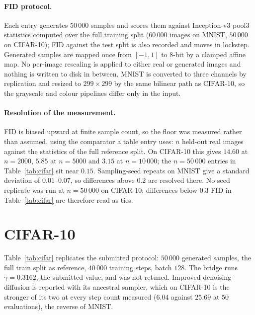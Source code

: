 \documentclass[11pt,a4paper]{article}
\begin{document}
\paragraph{FID protocol.} Each entry generates $50\,000$ samples and scores them
against Inception-v3 pool3 statistics computed over the full training split
($60\,000$ images on MNIST, $50\,000$ on CIFAR-10); FID against the test split is
also recorded and moves in lockstep. Generated samples are mapped once from
$[-1,1]$ to 8-bit by a clamped affine map. No per-image rescaling is applied to
either real or generated images and nothing is written to disk in between. MNIST
is converted to three channels by replication and resized to $299\times299$ by
the same bilinear path as CIFAR-10, so the grayscale and colour pipelines differ
only in the input.

\paragraph{Resolution of the measurement.} FID is biased upward at finite sample
count, so the floor was measured rather than assumed, using the comparator a
table entry uses: $n$ held-out real images against the statistics of the full
reference split. On CIFAR-10 this gives $14.60$ at $n=2000$, $5.85$ at $n=5000$
and $3.15$ at $n=10\,000$; the $n=50\,000$ entries in Table~\ref{tab:cifar} sit
near $0.15$. Sampling-seed repeats on MNIST give a standard deviation of
$0.01$--$0.07$, so differences above $0.2$ are resolved there. No seed replicate
was run at $n=50\,000$ on CIFAR-10; differences below $0.3$ FID in
Table~\ref{tab:cifar} are therefore read as ties.

\section{CIFAR-10}
\label{sec:cifar}

Table~\ref{tab:cifar} replicates the submitted protocol: $50\,000$ generated
samples, the full train split as reference, $40\,000$ training steps, batch
$128$. The bridge runs $\gamma=0.3162$, the submitted value, and was not
retuned. Improved denoising diffusion is reported with its ancestral sampler,
which on CIFAR-10 is the stronger of its two at every step count measured
($6.04$ against $25.69$ at $50$ evaluations), the reverse of MNIST.

\begin{table}[h]
\centering
\caption{CIFAR-10, FID against the train split, $50\,000$ generated samples per
entry. Sampling steps equal network evaluations. Bold marks the best entry in
each column.}
\label{tab:cifar}
\resizebox{\textwidth}{!}{}
\end{table}
\end{document}

